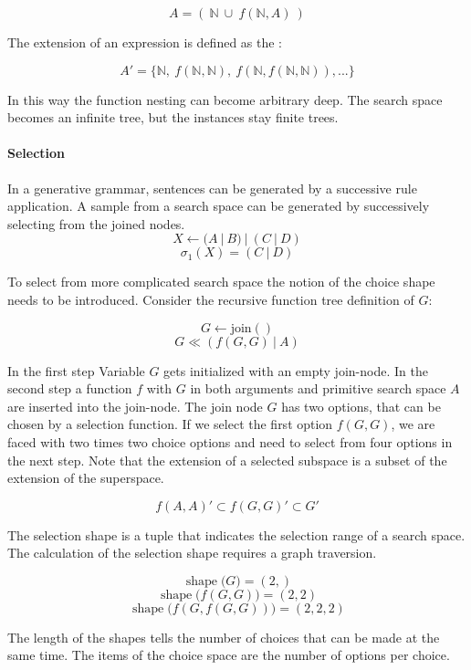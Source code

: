 \documentclass[english]{article}
\begin{document}
$$ A = (\ \mathbb{N}\ \cup\ f(\mathbb{N}, A)\ ) $$

The extension of an expression is defined as the  :

$$ A' = \{\mathbb{N},\ f(\mathbb{N}, \mathbb{N}),\ f(\mathbb{N}, f(\mathbb{N}, \mathbb{N})), ... \}$$

In this way the function nesting can become arbitrary deep. The search space becomes an infinite tree, but the instances stay finite trees.

\paragraph{Selection}
In a generative grammar, sentences can be generated by a successive rule application. A sample from a search space can be generated by successively selecting from the joined nodes.
$$X \leftarrow (A\ |\ B)\ |\ (C\ |\ D)$$
$$\sigma_1(X) = (C\ |\ D)$$

To select from more complicated search space the notion of the choice shape needs to be introduced. Consider the recursive function tree definition of $G$:

$$ G \leftarrow \operatorname{join()}$$
$$ G \ll (f(G,G)\ |\ A)$$

In the first step Variable $G$ gets initialized with an empty join-node. In the second step a function $f$ with $G$ in both arguments and primitive search space $A$ are inserted into the join-node. The join node $G$ has two options, that can be chosen by a selection function. If we select the first option $f(G,G)$, we are faced with two times two choice options and need to select from four options in the next step. Note that the extension of a selected subspace is a subset of the extension of the superspace.

$$ f(A,A)' \subset f(G,G)' \subset G' $$

 The selection shape is a tuple that indicates the selection range of a search space. The calculation of the selection shape requires a graph traversion.

$$\operatorname{shape}\big(G\big) = (2,)$$
$$\operatorname{shape}\big(f(G,G)\big) = (2,2)$$
$$\operatorname{shape}\big(f(G,f(G,G))\big) = (2,2,2)$$

The length of the shapes tells the number of choices that can be made at the same time. The items of the choice space are the number of options per choice.
\end{document}
